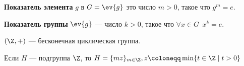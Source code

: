 \begin{definition}
    \textbf{Показатель элемента} \(g\) в \(G = \ev{g}\) это число \(m > 0\), такое что \(g^m = e\).
\end{definition}

\begin{definition}
    \textbf{Показатель группы} \(\ev{g}\) --- число \(k > 0\), такое что \(\forall x \in G \ \ x^k = e\).
\end{definition}

\begin{example}
    \((\Z, +)\) --- бесконечная циклическая группа.

    Если \(H\) --- подгруппа \(\Z\), то \(H = \{mz\}_{m \in \Z}, z \coloneqq \min\{t \in \Z \mid t > 0\}\)
\end{example}
